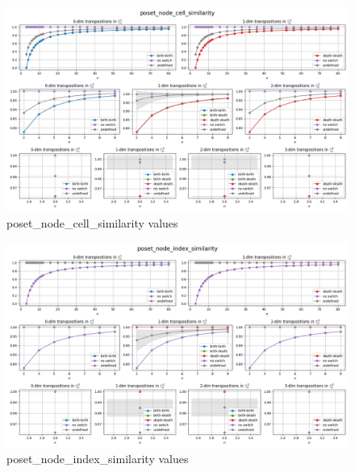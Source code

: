 \documentclass{article}
\begin{document}
\begin{figure}[h!]
    \hspace*{-3cm}
    \centering
    \includegraphics[width=1.5\textwidth]{pics/torus-transpositions/similaritites/score=poset-node-cell-similarity.png}
    \caption{poset\_node\_cell\_similarity values}
    \label{fig:poset-node-cell-similarity}
\end{figure}
\begin{figure}[h!]
    \hspace*{-3cm}
    \centering
    \includegraphics[width=1.5\textwidth]{pics/torus-transpositions/similaritites/score=poset-node-index-similarity.png}
    \caption{poset\_node\_index\_similarity values}
    \label{fig:poset-node-index-similarity}
\end{figure}
\end{document}
